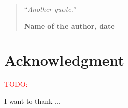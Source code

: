 \documentclass[11pt,a4paper,oneside]{book}
\newcommand{\todo}[1]{\textcolor{red}{TODO: #1}}
\begin{document}
\medskip

\begin{quotation}
\noindent ``\emph{Another quote.}''
\begin{flushright}\textbf{Name of the author, date}\end{flushright}
\end{quotation}
\chapter*{Acknowledgment}
\thispagestyle{empty} 

\todo{}

\noindent I want to thank ...

\thispagestyle{empty} 
\setcounter{page}{0}
\tableofcontents
\mainmatter 














\begin{appendices}
    
\end{appendices}

\appendix

\backmatter

\printindex %




\end{document}
